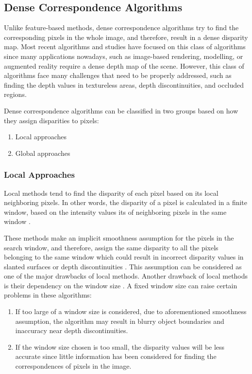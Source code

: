 \documentclass[dvips,letterpaper,12pt]{report}
\begin{document}
\subsection{Dense Correspondence Algorithms}
Unlike feature-based methods, dense correspondence algorithms try to find the
corresponding pixels in the whole image, and therefore, result in a dense disparity map. Most recent algorithms and studies have focused on this class of algorithms since many applications 
nowadays, such as image-based rendering, modelling, or augmented reality require a dense depth map of the scene. However, this class of algorithms face many challenges that need to be properly
addressed, such as finding the depth values in textureless areas, depth discontinuities, and occluded regions.

Dense correspondence algorithms can be classified in two groups based on how they assign
disparities to pixels:
\begin{enumerate}
\item Local approaches
\item Global approaches
\end{enumerate}

\subsubsection{Local Approaches}
\newline
Local methods tend to find the disparity of each pixel based on its local neighboring pixels. In
other words, the disparity of a pixel is calculated in a finite window, based on the intensity values
its of neighboring pixels in the same window \cite{sch02}.

These methods make an implicit smoothness assumption for the pixels in the search
window, and therefore, assign the same disparity to all the pixels belonging to the same window which could result in incorrect disparity values in slanted surfaces or
depth discontinuities \cite{hirsch02}. This assumption can be considered as one of the major drawbacks of local methods.
Another drawback of local methods is their dependency on the window size \cite{sch02}. A fixed window size can raise certain problems in these algorithms:
\begin{enumerate}
\item If too large of a window size is considered, due to aforementioned smoothness assumption, the algorithm may result in blurry object boundaries and inaccuracy near depth discontinuities.
\item If the window size chosen is too small, the disparity values will be less accurate since little information has been considered for 
finding the correspondences of pixels in the image.
\end{enumerate}
\end{document}
